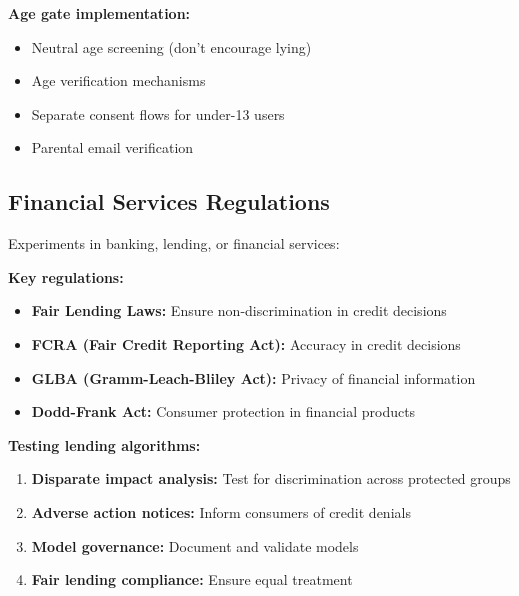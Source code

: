\textbf{Age gate implementation:}
\begin{itemize}
    \item Neutral age screening (don't encourage lying)
    \item Age verification mechanisms
    \item Separate consent flows for under-13 users
    \item Parental email verification
\end{itemize}

\subsection{Financial Services Regulations}

Experiments in banking, lending, or financial services:

\textbf{Key regulations:}
\begin{itemize}
    \item \textbf{Fair Lending Laws:} Ensure non-discrimination in credit decisions
    \item \textbf{FCRA (Fair Credit Reporting Act):} Accuracy in credit decisions
    \item \textbf{GLBA (Gramm-Leach-Bliley Act):} Privacy of financial information
    \item \textbf{Dodd-Frank Act:} Consumer protection in financial products
\end{itemize}

\textbf{Testing lending algorithms:}
\begin{enumerate}
    \item \textbf{Disparate impact analysis:} Test for discrimination across protected groups
    \item \textbf{Adverse action notices:} Inform consumers of credit denials
    \item \textbf{Model governance:} Document and validate models
    \item \textbf{Fair lending compliance:} Ensure equal treatment
\end{enumerate}

